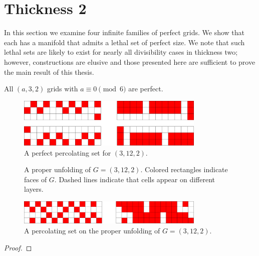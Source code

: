 
\section{Thickness 2}

In this section we examine four infinite families of perfect grids. We show that each has a manifold that admits a lethal set of perfect size. We note that such lethal sets are likely to exist for nearly all divisibility cases in thickness two; however, constructions are elusive and those presented here are sufficient to prove the main result of this thesis.

\begin{con}
All $(a,3,2)$ grids with $a \equiv 0 \pmod 6$ are perfect. 
\end{con}

\begin{figure}[]
\centering
\includegraphics[width=0.8\textwidth]{figures/4/3x12x2.pdf}
\caption{A perfect percolating set for $(3,12,2)$.}
\label{fig:3x12x2}
\end{figure} 

\begin{figure}[]
\centering
\caption{A proper unfolding of $G= (3,12,2)$. Colored rectangles indicate faces of $G$. Dashed lines indicate that cells appear on different layers. }
\label{fig:3x12x2_manifold}
\end{figure} 

\begin{figure}[]
\centering
\includegraphics[width=0.8\textwidth]{figures/4/3x12x2_unfolded_lethal.pdf}
\caption{A percolating set on the proper unfolding of $G= (3,12,2)$.}
\label{fig:3x12x2_unfolded_lethal}
\end{figure} 

\begin{proof}
\end{proof}

